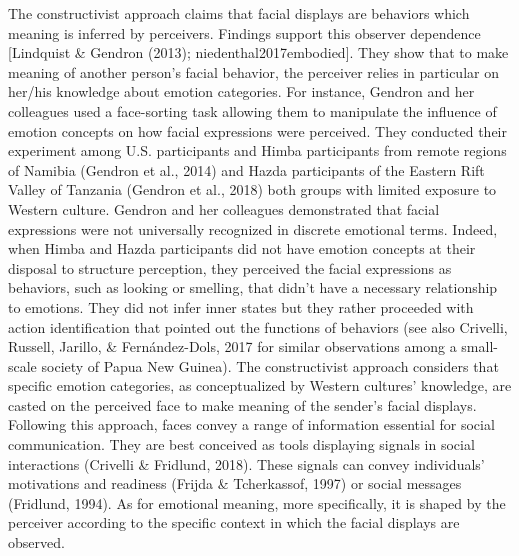 \documentclass[man]{apa6}
\begin{document}
The constructivist approach claims that facial displays are behaviors which meaning is inferred by perceivers. Findings support this observer dependence {[}Lindquist \& Gendron (2013); niedenthal2017embodied{]}. They show that to make meaning of another person's facial behavior, the perceiver relies in particular on her/his knowledge about emotion categories. For instance, Gendron and her colleagues used a face-sorting task allowing them to manipulate the influence of emotion concepts on how facial expressions were perceived. They conducted their experiment among U.S. participants and Himba participants from remote regions of Namibia (Gendron et al., 2014) and Hazda participants of the Eastern Rift Valley of Tanzania (Gendron et al., 2018) both groups with limited exposure to Western culture. Gendron and her colleagues demonstrated that facial expressions were not universally recognized in discrete emotional terms. Indeed, when Himba and Hazda participants did not have emotion concepts at their disposal to structure perception, they perceived the facial expressions as behaviors, such as looking or smelling, that didn't have a necessary relationship to emotions. They did not infer inner states but they rather proceeded with action identification that pointed out the functions of behaviors (see also Crivelli, Russell, Jarillo, \& Fernández-Dols, 2017 for similar observations among a small-scale society of Papua New Guinea). The constructivist approach considers that specific emotion categories, as conceptualized by Western cultures' knowledge, are casted on the perceived face to make meaning of the sender's facial displays. Following this approach, faces convey a range of information essential for social communication. They are best conceived as tools displaying signals in social interactions (Crivelli \& Fridlund, 2018). These signals can convey individuals' motivations and readiness (Frijda \& Tcherkassof, 1997) or social messages (Fridlund, 1994). As for emotional meaning, more specifically, it is shaped by the perceiver according to the specific context in which the facial displays are observed.
\end{document}
